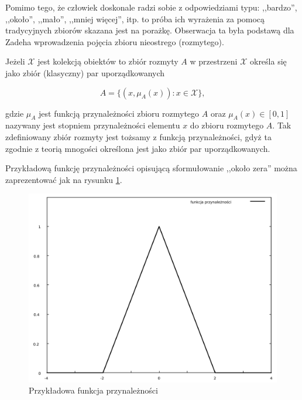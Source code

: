 Pomimo tego, że człowiek doskonale radzi sobie z odpowiedziami typu: ,,bardzo'',
,,około'', ,,mało'', ,,mniej więcej'', itp. to próba ich wyrażenia za pomocą
tradycyjnych zbiorów skazana jest na porażkę. Obserwacja ta była podstawą dla
Zadeha wprowadzenia pojęcia zbioru nieostrego (rozmytego).

\begin{definition}
Jeżeli $\mathcal{X}$ jest kolekcją obiektów to zbiór rozmyty $A$ w przestrzeni
$\mathcal{X}$ określa się jako zbiór (klasyczny) par uporządkowanych

\begin{equation}
A = \{ (x, \mu_A(x)) : x \in \mathcal{X} \},
\end{equation}

gdzie $\mu_A$ jest funkcją przynależności zbioru rozmytego $A$ oraz $\mu_A(x)
\in [0,1]$ nazywany jest stopniem przynależności elementu $x$ do zbioru
rozmytego $A$. Tak zdefiniowany zbiór rozmyty jest tożsamy z funkcją
przynależności, gdyż ta zgodnie z teorią mnogości określona jest jako zbiór par
uporządkowanych.
\end{definition}

Przykładową funkcję przynależności opisującą sformułowanie ,,około zera'' można
zaprezentować jak na rysunku \ref{fig:funkcja_przynaleznosci}.

\begin{figure}[ht]
  \includegraphics[width=\linewidth]
  	{chapters/fuzzylogic/funkcja_przynaleznosci}
  \caption{Przykładowa funkcja przynależności}
  \label{fig:funkcja_przynaleznosci}
\end{figure}

